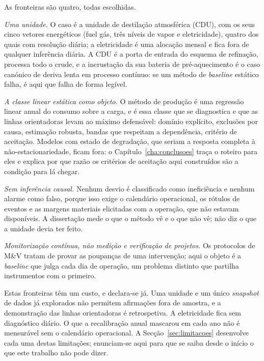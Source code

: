 As fronteiras são quatro, todas escolhidas.

\emph{Uma unidade.} O caso é a unidade de destilação atmosférica (CDU),
com os seus cinco vetores energéticos (fuel gás, três níveis de vapor e
eletricidade), quatro dos quais com resolução diária; a
eletricidade é uma alocação mensal e fica fora de qualquer inferência
diária. A CDU é a porta de entrada do esquema de refinação, processa
todo o crude, e a incrustação da sua bateria de pré-aquecimento é o
caso canónico de deriva lenta em processo contínuo: se um método de
\emph{baseline} estático falha, é aqui que falha de forma legível.

\emph{A classe linear estática como objeto.} O método de produção é uma
regressão linear anual do consumo sobre a carga, e é essa classe que se
diagnostica e que as linhas orientadoras levam ao máximo defensável:
domínio explícito, exclusões por causa, estimação robusta, bandas que
respeitam a dependência, critério de aceitação. Modelos com estado de
degradação, que seriam a resposta completa à não-estacionariedade,
ficam fora: o Capítulo~\ref{cha:conclusoes} traça o roteiro para eles e
explica por que razão os critérios de aceitação aqui construídos são a
condição para lá chegar.

\emph{Sem inferência causal.} Nenhum desvio é classificado como
ineficiência e nenhum alarme como falso, porque isso exige o calendário
operacional, os rótulos de eventos e as margens materiais elicitadas
com a operação, que não estavam disponíveis. A dissertação mede o que o
método vê e o que não vê; não diz o que a unidade devia ter feito.

\emph{Monitorização contínua, não medição e verificação de projetos.}
Os protocolos de M\&V tratam de provar as poupanças de uma intervenção;
aqui o objeto é a \emph{baseline} que julga cada dia de operação, um
problema distinto que partilha instrumentos com o primeiro.

Estas fronteiras têm um custo, e declara-se já. Uma unidade e um único
\emph{snapshot} de dados já explorados não permitem afirmações fora de
amostra, e a demonstração das linhas orientadoras é retrospetiva. A
eletricidade fica sem diagnóstico diário. O que a recalibração anual
mascarou em cada ano não é mensurável sem o calendário operacional. A
Secção~\ref{sec:limitacoes} desenvolve cada uma destas limitações;
enunciam-se aqui para que se saiba desde o início o que este trabalho
não pode dizer.

